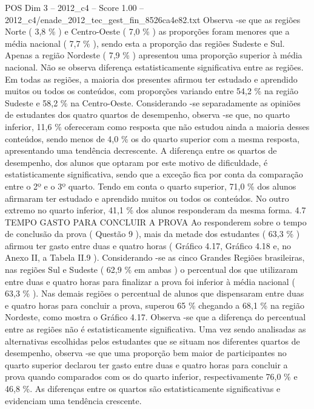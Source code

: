 \begin{textsample}{POS Dim 3 – 2012\_c4 – Score 1.00 – 2012\_c4/enade\_2012\_tec\_gest\_fin\_8526ca4e82.txt}
Observa -se que as regiões Norte ( 3,8 \% ) e Centro-Oeste ( 7,0 \% ) as proporções foram menores que a média nacional ( 7,7 \% ), sendo esta a proporção das regiões Sudeste e Sul.
Apenas a região Nordeste ( 7,9 \% ) apresentou uma proporção superior à média nacional.
Não se observa diferença estatisticamente significativa entre as regiões.
Em todas as regiões, a maioria dos presentes afirmou ter estudado e aprendido muitos ou todos os conteúdos, com proporções variando entre 54,2 \% na região Sudeste e 58,2 \% na Centro-Oeste.
Considerando -se separadamente as opiniões de estudantes dos quatro quartos de desempenho, observa -se que, no quarto inferior, 11,6 \% ofereceram como resposta que não estudou ainda a maioria desses conteúdos, sendo menos de 4,0 \% os do quarto superior com a mesma resposta, apresentando uma tendência decrescente.
A diferença entre os quartos de desempenho, dos alunos que optaram por este motivo de dificuldade, é estatisticamente significativa, sendo que a exceção fica por conta da comparação entre o 2º e o 3º quarto.
Tendo em conta o quarto superior, 71,0 \% dos alunos afirmaram ter estudado e aprendido muitos ou todos os conteúdos.
No outro extremo no quarto inferior, 41,1 \% dos alunos responderam da mesma forma. 4.7 TEMPO GASTO PARA CONCLUIR A PROVA Ao responderem sobre o tempo de conclusão da prova ( Questão 9 ), mais da metade dos estudantes ( 63,3 \% ) afirmou ter gasto entre duas e quatro horas ( Gráfico 4.17, Gráfico 4.18 e, no Anexo II, a Tabela II.9 ).
Considerando -se as cinco Grandes Regiões brasileiras, nas regiões Sul e Sudeste ( 62,9 \% em ambas ) o percentual dos que utilizaram entre duas e quatro horas para finalizar a prova foi inferior à média nacional ( 63,3 \% ).
Nas demais regiões o percentual de alunos que dispensaram entre duas e quatro horas para concluir a prova, superou 65 \% chegando a 68,1 \% na região Nordeste, como mostra o Gráfico 4.17.
Observa -se que a diferença do percentual entre as regiões não é estatisticamente significativa.
Uma vez sendo analisadas as alternativas escolhidas pelos estudantes que se situam nos diferentes quartos de desempenho, observa -se que uma proporção bem maior de participantes no quarto superior declarou ter gasto entre duas e quatro horas para concluir a prova quando comparados com os do quarto inferior, respectivamente 76,0 \% e 46,8 \%.
As diferenças entre os quartos são estatisticamente significativas e evidenciam uma tendência crescente.

\end{textsample}
